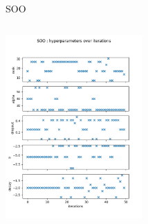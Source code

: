 \begin{frame}[allowframebreaks]{SOO}
\begin{columns}
        \begin{column}{0.4\textwidth}
            \includegraphics[height = 7cm]{imgs/plots/exp10_variables_over_time.png}
            
            
        \end{column}
    \end{columns}  
\end{frame}

